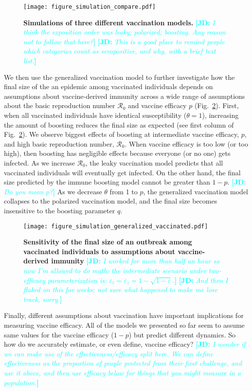 \documentclass[12pt]{article}
\newcommand{\comment}{\showcomment}
\newcommand{\showcomment}[3]{\textcolor{#1}{\textbf{[#2: }\textsl{#3}\textbf{]}}}
\newcommand{\jd}[1]{\comment{cyan}{JD}{#1}}
\newcommand{\fref}[1]{Fig.~\ref{fig:#1}}
\begin{document}
\begin{figure}[!th]
\texttt{[image: figure\_simulation\_compare.pdf]}
\caption{
\textbf{Simulations of three different vaccination models.}
\jd{I think the exposition order was leaky; polarized; boosting. Any reason not to follow that here?}
\jd{This is a good place to remind people which categories count as seropositive, and why, with a brief text list.}
\label{fig:simulation}
}
\end{figure}

We then use the generalized vaccination model to further investigate how the final size of the an epidemic among vaccinated individuals depends on assumptions about vaccine-derived immunity across a wide range of assumptions about the basic reproduction number $\mathcal R_0$ and vaccine efficacy $p$ (\fref{sensitivity}).
First, when all vaccinated individuals have identical susceptibility ($\theta = 1$), increasing the amount of boosting reduces the final size as expected (see first column of \fref{sensitivity}).
We observe biggest effects of boosting at intermediate vaccine efficacy, $p$, and high basic reproduction number, $\mathcal R_0$.
When vaccine efficacy is too low (or too high), then boosting has negligible effects because everyone (or no one) gets infected.
As we increase $\mathcal R_0$, the leaky vaccination model predicts that all vaccinated individuals will eventually get infected.
On the other hand, the final size predicted by the immune boosting model cannot be greater than $1-p$. \jd{Do you mean $p$?}
As we decrease $\theta$ from 1 to $p$, the generalized vaccination model collapses to the polarized vaccination model, and the final size becomes insensitive to the boosting parameter $q$.

\begin{figure}[!th]
\texttt{[image: figure\_simulation\_generalized\_vaccinated.pdf]}
\caption{
\textbf{Sensitivity of the final size of an outbreak among vaccinated individuals to assumptions about vaccine-derived immunity}
\jd{I worked for more than half an hour so now I'm allowed to do math: the intermediate scenario under two-efficacy parameterization is: $\varepsilon_\ell = \varepsilon_z = 1 - \sqrt{1-\varepsilon}$.}
\jd{And then I flaked on this for weeks; not sure what happened to make me lose track, sorry.}
\label{fig:sensitivity}
}
\end{figure}

Finally, different assumptions about vaccination have important implications for measuring vaccine efficacy.
All of the models we presented so far seem to assume same values for the vaccine efficacy ($1-p$) but predict different dynamics. 
So how do we accurately estimate, or even define, vaccine efficacy?
\jd{I wonder if we can make use of the effectiveness/efficacy split here. We can define effectiveness as the proportion of people protected from their first challenge, and use it above, and then use efficacy below for things that you might measure in a population.}
\end{document}
